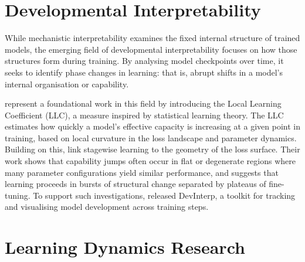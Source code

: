 

\section{Developmental Interpretability}

While mechanistic interpretability examines the fixed internal structure of trained models, the emerging field of developmental interpretability focuses on how those structures form during training. By analysing model checkpoints over time, it seeks to identify phase changes in learning: that is, abrupt shifts in a model's internal organisation or capability.

\citet{hoogland2023towards} represent a foundational work in this field by introducing the Local Learning Coefficient (LLC), a measure inspired by statistical learning theory. The LLC estimates how quickly a model's effective capacity is increasing at a given point in training, based on local curvature in the loss landscape and parameter dynamics. Building on this, \citet{hoogland2024losslandscape} link stagewise learning to the geometry of the loss surface. Their work shows that capability jumps often occur in flat or degenerate regions where many parameter configurations yield similar performance, and suggests that learning proceeds in bursts of structural change separated by plateaus of fine-tuning. To support such investigations, \citet{devinterpcode} released DevInterp, a toolkit for tracking and visualising model development across training steps.

\section{Learning Dynamics Research}

